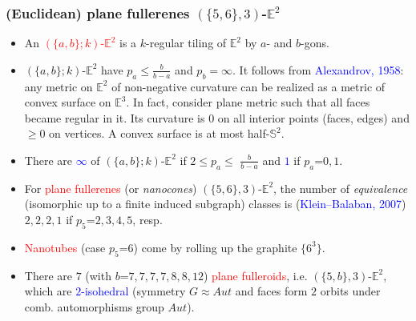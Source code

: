 \documentclass{beamer}
\begin{document}
\begin{frame}\frametitle{(Euclidean) plane fullerenes $(\{5,6\},3)$-$\mathbb{E}^2$}
\vspace{-2.5mm}
\begin{itemize}
\item An \textcolor{red}{$(\{a,b\};k)$-$\mathbb{E}^2$} is a $k$-regular tiling  of 
$\mathbb{E}^2$ by 
$a$- and $b$-gons. 

\item 
$(\{a,b\};k)$-$\mathbb{E}^2$ have
$p_a \leq \frac{b}{b-a}$ and $p_b=\infty$. It follows from
\textcolor{blue}{Alexandrov, 1958}: any metric on $\mathbb{E}^2$  of
non-negative curvature can be realized as a metric of
convex surface on $\mathbb{E}^3$.
In fact, consider plane metric such that
all faces became regular in it. Its curvature is $0$ on all
interior points (faces, edges) and $\geq 0$ on vertices. 
A convex
surface is at most half-$\mathbb{S}^2$.
\item There are \textcolor{blue}{$\infty$}  of $(\{a,b\};k)$-$\mathbb{E}^2$ if $2$$\le$$ p_a$$\le$  
$\frac{b}{b-a}$ and  \textcolor{blue}{$1$} if $p_a$=$0,1$.
\item For \textcolor{red}{plane fullerenes} (or {\em nanocones}) 
$(\{5,6\},3)$-$\mathbb{E}^2$,  
the number of {\em equivalence} (isomorphic up to a finite induced subgraph) classes is (\textcolor{blue}{Klein--Balaban, 2007})
$2,2,2,1$ if $p_5$=$2,3,4,5$, resp.

\item \textcolor{red}{Nanotubes} (case $p_5$=$6$) come by rolling up the graphite 
 $\{6^3\}$.

\item 
There are $7$ (with $b$=$7,7,7,7,8,8,12$) \textcolor{red}{plane fulleroids}, i.e.
 $(\{5,b\},3)$-$\mathbb{E}^2$, which are \textcolor{blue}{$2$-isohedral}
 (symmetry $G\approx Aut$ and
 faces form $2$ orbits under  comb. automorphisms group $Aut$).



\end{itemize}
\end{frame}
\end{document}
